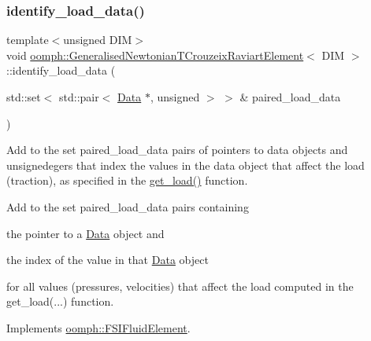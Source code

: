 \mbox{\label{classoomph_1_1GeneralisedNewtonianTCrouzeixRaviartElement_a85b72520add7d7bc30e3b9229a6b73fd}} 
\subsubsection{\texorpdfstring{identify\+\_\+load\+\_\+data()}{identify\_load\_data()}}
{\footnotesize\ttfamily template$<$unsigned D\+IM$>$ \\
void \hyperlink{classoomph_1_1GeneralisedNewtonianTCrouzeixRaviartElement}{oomph\+::\+Generalised\+Newtonian\+T\+Crouzeix\+Raviart\+Element}$<$ D\+IM $>$\+::identify\+\_\+load\+\_\+data (\begin{DoxyParamCaption}\item[{std\+::set$<$ std\+::pair$<$ \hyperlink{classoomph_1_1Data}{Data} $\ast$, unsigned $>$ $>$ \&}]{paired\+\_\+load\+\_\+data }\end{DoxyParamCaption})\hspace{0.3cm}{\ttfamily [virtual]}}



Add to the set paired\+\_\+load\+\_\+data pairs of pointers to data objects and unsignedegers that index the values in the data object that affect the load (traction), as specified in the \hyperlink{classoomph_1_1GeneralisedNewtonianNavierStokesEquations_ad69fe16e07deef80069fb1b27c19caa1}{get\+\_\+load()} function. 

Add to the set {\ttfamily paired\+\_\+load\+\_\+data} pairs containing
\begin{DoxyItemize}
\item the pointer to a \hyperlink{classoomph_1_1Data}{Data} object and
\item the index of the value in that \hyperlink{classoomph_1_1Data}{Data} object
\end{DoxyItemize}for all values (pressures, velocities) that affect the load computed in the {\ttfamily get\+\_\+load}(...) function. 

Implements \hyperlink{classoomph_1_1FSIFluidElement_a13c5f835cddd1b78e6d2582733619300}{oomph\+::\+F\+S\+I\+Fluid\+Element}.



